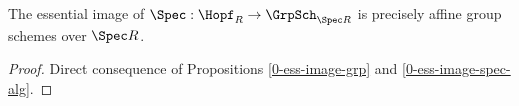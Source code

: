 \begin{proposition}
  \label{0-ess-image-spec-hopf}
  \leanok

  The essential image of $\Spec : \Hopf_R \to \GrpSch_{\Spec R}$ is precisely affine group schemes over $\Spec R$.
\end{proposition}
\begin{proof}
  \leanok

  Direct consequence of Propositions \ref{0-ess-image-grp} and \ref{0-ess-image-spec-alg}.
\end{proof}
